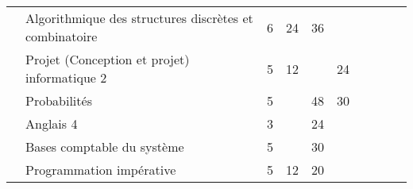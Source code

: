 \documentclass[10pt, a5paper]{report}
\begin{document}
\begin{tabular}{c|m{6cm}|cm{1cm}|cm{1cm}|cm{1cm}|cm{1cm}|}
 & \color{black} \mbox{Algorithmique} \mbox{des} \mbox{structures} \mbox{discrètes} \mbox{et} \mbox{combinatoire}  & \color{black} 6 & \color{black} 24 & \color{black} 36 & \color{black}  \\ \cline{2-6}
 & \cellcolor{couleurClaire} \color{couleurTexte} \mbox{Projet} \mbox{(Conception} \mbox{et} \mbox{projet)} \mbox{informatique} \mbox{2}  & \cellcolor{couleurClaire} \color{couleurTexte} 5 & \cellcolor{couleurClaire} \color{couleurTexte} 12 & \cellcolor{couleurClaire} \color{couleurTexte}  & \cellcolor{couleurClaire} \color{couleurTexte} 24 \\ \cline{2-6}
 & \color{black} \mbox{Probabilités}  & \color{black} 5 & \color{black}  & \color{black} 48 & \color{black} 30 \\ \cline{2-6}
 & \cellcolor{couleurClaire} \color{couleurTexte} \mbox{Anglais} \mbox{4}  & \cellcolor{couleurClaire} \color{couleurTexte} 3 & \cellcolor{couleurClaire} \color{couleurTexte}  & \cellcolor{couleurClaire} \color{couleurTexte} 24 & \cellcolor{couleurClaire} \color{couleurTexte}  \\ \cline{2-6}
 & \color{black} \mbox{Bases} \mbox{comptable} \mbox{du} \mbox{système}  & \color{black} 5 & \color{black}  & \color{black} 30 & \color{black}  \\ \cline{2-6}
 & \cellcolor{couleurClaire} \color{couleurTexte} \mbox{Programmation} \mbox{impérative}  & \cellcolor{couleurClaire} \color{couleurTexte} 5 & \cellcolor{couleurClaire} \color{couleurTexte} 12 & \cellcolor{couleurClaire} \color{couleurTexte} 20 & \cellcolor{couleurClaire} \color{couleurTexte}  \\ \cline{2-6}
\hline
\end{tabular}
\end{document}
